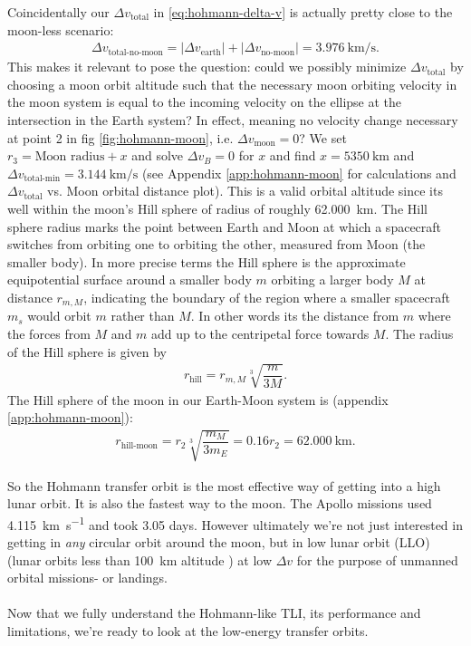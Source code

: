 Coincidentally our $\Delta v_{\text{total}}$ in \ref{eq:hohmann-delta-v} is actually pretty close to the moon-less scenario:
\begin{align}
\Delta v_{\text{total-no-moon}} = |\Delta v_{\text{earth}}| + |\Delta v_{\text{no-moon}}| = \SI{3.976}{\km\per\s}.
\end{align}
This makes it relevant to pose the question: could we possibly minimize $\Delta v_{\text{total}}$ by choosing a moon orbit altitude such that the necessary moon orbiting velocity in the moon system is equal to the incoming velocity on the ellipse at the intersection in the Earth system? In effect, meaning no velocity change necessary at point 2 in fig \ref{fig:hohmann-moon}, i.e. $\Delta v_{\text{moon}} = 0$? We set $r_3 = \text{Moon radius} + x$ and solve $\Delta v_B = 0$ for $x$ and find $x = \SI{5350}{\km}$ and $\Delta v_\text{total-min} = \SI{3.144}{\km\per\second}$ (see Appendix \ref{app:hohmann-moon} for calculations and $\Delta v_\text{total}$ vs. Moon orbital distance plot). This is a valid orbital altitude since its well within the moon's Hill sphere of radius of roughly \SI{62,000}{\km}. The Hill sphere radius marks the point between Earth and Moon at which a spacecraft switches from orbiting one to orbiting the other, measured from Moon (the smaller body). In more precise terms the Hill sphere is the approximate equipotential surface around a smaller body $m$ orbiting a larger body $M$ at distance $r_{m,M}$, indicating the boundary of the region where a smaller spacecraft $m_s$ would orbit $m$ rather than $M$. In other words its the distance from $m$ where the forces from $M$ and $m$ add up to the centripetal force towards $M$. The radius of the Hill sphere is given by \cite{Murray1999}
\begin{align}
r_{\text{hill}} = r_{m,M}\sqrt[3]{\dfrac{m}{3M}}. \label{eq:hill-sphere}
\end{align}
The Hill sphere of the moon in our Earth-Moon system is (appendix \ref{app:hohmann-moon}):
\begin{align}
r_{\text{hill-moon}} = r_2\sqrt[3]{\dfrac{m_M}{3m_E}} = 0.16 r_2 = \SI{62,000}{\km}.
\end{align}

So the Hohmann transfer orbit is the most effective way of getting into a high lunar orbit. It is also the fastest way to the moon. The Apollo missions used \SI{4.115}{\km\per\s} and took 3.05 days. However ultimately we're not just interested in getting in \emph{any} circular orbit around the moon, but in low lunar orbit (LLO) (lunar orbits less than \SI{100}{\km} altitude \cite{NASA1966}) at low $\Delta v$ for the purpose of unmanned orbital missions- or landings.\\
\\
Now that we fully understand the Hohmann-like TLI, its performance and limitations, we're ready to look at the low-energy transfer orbits.


